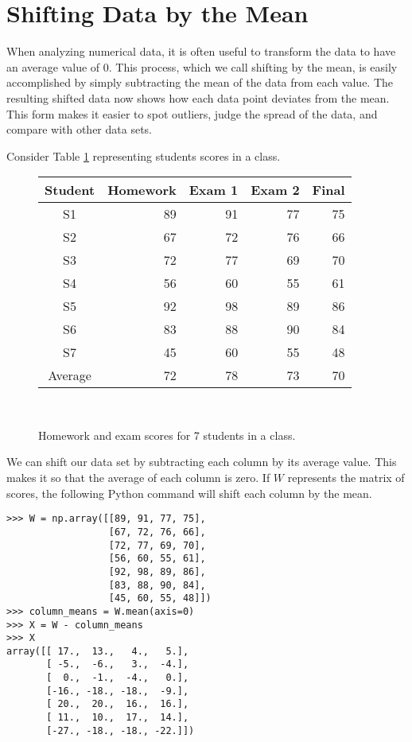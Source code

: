 \label{Stats1}



\section*{Shifting Data by the Mean}
When analyzing numerical data, it is often useful to transform the data to have an average value of 0.
This process, which we call shifting by the mean, 
is easily accomplished by simply subtracting the mean of the data from each value. 
The resulting shifted data now shows how each data point deviates from the mean.
This form makes it easier to spot outliers, judge the spread of the data, and compare with other data sets.

Consider Table \ref{tab:data} representing students scores in a class.\\

\begin{figure}
\begin{center}
\begin{tabular}{|c|r|r|r|r|}
	\hline
Student & Homework & Exam 1  & Exam 2 & Final \\
\hline
S1  & 89 & 91 & 77 & 75 \\
S2  & 67 & 72 & 76 & 66 \\
S3  & 72 & 77 & 69 & 70 \\
S4  & 56 & 60 & 55 & 61 \\
S5  & 92 & 98 & 89 & 86 \\
S6  & 83 & 88 & 90 & 84 \\
S7  & 45 & 60 & 55 & 48 \\
\hline
Average  & 72 & 78 & 73 & 70\\
\hline
\end{tabular}\\
\end{center}
\caption{Homework and exam scores for 7 students in a class.}
\label{tab:data}
\end{figure}

We can shift our data set by subtracting each column by its average value.  
This makes it so that the average of each column is zero.  
If $W$ represents the matrix of scores, the following Python command will shift each column by the mean.
\begin{lstlisting}
>>> W = np.array([[89, 91, 77, 75],
                  [67, 72, 76, 66],
                  [72, 77, 69, 70],
                  [56, 60, 55, 61],
                  [92, 98, 89, 86],
                  [83, 88, 90, 84],
                  [45, 60, 55, 48]])
>>> column_means = W.mean(axis=0)
>>> X = W - column_means
>>> X
array([[ 17.,  13.,   4.,   5.],
       [ -5.,  -6.,   3.,  -4.],
       [  0.,  -1.,  -4.,   0.],
       [-16., -18., -18.,  -9.],
       [ 20.,  20.,  16.,  16.],
       [ 11.,  10.,  17.,  14.],
       [-27., -18., -18., -22.]])
\end{lstlisting}

